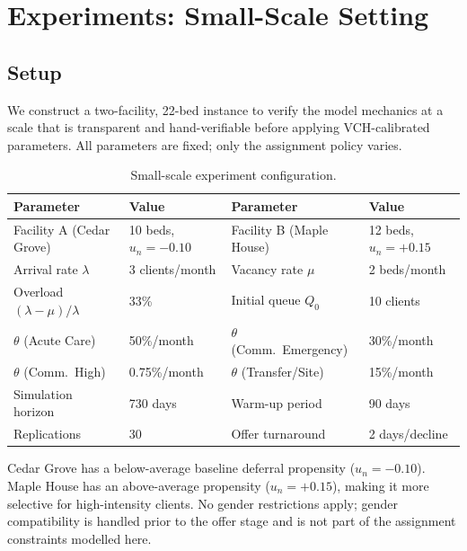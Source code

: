 
\section{Experiments: Small-Scale Setting}
\label{sec:small}

\subsection{Setup}

We construct a two-facility, 22-bed instance to verify the model mechanics at a
scale that is transparent and hand-verifiable before applying VCH-calibrated parameters.
All parameters are fixed; only the assignment policy varies.

\begin{table}[H]
\centering
\caption{Small-scale experiment configuration.}
\label{tab:small_config}
\begin{tabular}{@{}p{3.6cm}p{3.0cm}p{3.6cm}p{3.0cm}@{}}
\toprule
\textbf{Parameter} & \textbf{Value} & \textbf{Parameter} & \textbf{Value} \\
\midrule
Facility A (Cedar Grove)
  & 10 beds, $u_n = -0.10$
  & Facility B (Maple House)
  & 12 beds, $u_n = +0.15$ \\[2pt]
Arrival rate $\lambda$
  & 3 clients/month
  & Vacancy rate $\mu$
  & 2 beds/month \\[2pt]
Overload $(\lambda{-}\mu)/\lambda$
  & 33\%
  & Initial queue $Q_0$
  & 10 clients \\[2pt]
$\theta$ (Acute Care)
  & 50\%/month
  & $\theta$ (Comm.\ Emergency)
  & 30\%/month \\[2pt]
$\theta$ (Comm.\ High)
  & 0.75\%/month
  & $\theta$ (Transfer/Site)
  & 15\%/month \\[2pt]
Simulation horizon
  & 730 days
  & Warm-up period
  & 90 days \\[2pt]
Replications
  & 30
  & Offer turnaround
  & 2 days/decline \\
\bottomrule
\end{tabular}
\end{table}

Cedar Grove has a below-average baseline deferral propensity ($u_n = -0.10$).
Maple House has an above-average propensity ($u_n = +0.15$), making it more
selective for high-intensity clients. No gender restrictions apply; gender
compatibility is handled prior to the offer stage and is not part of the
assignment constraints modelled here.

